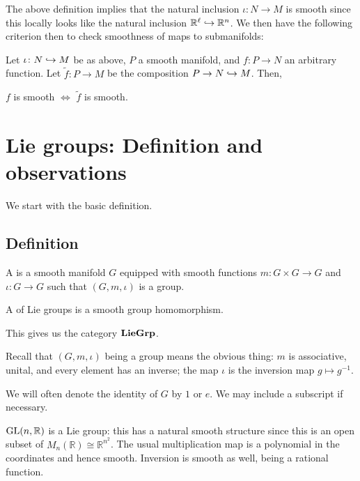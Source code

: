 \documentclass[12pt]{article}
\begin{document}
The above definition implies that the natural inclusion $\iota \colon N \to M$ is smooth since this locally looks like the natural inclusion $\mathbb{R}^{\ell} \hookrightarrow \mathbb{R}^{n}$.
We then have the following criterion then to check smoothness of maps to submanifolds:
\begin{thm} \label{thm:smoothness-into-submanifold}
	Let $\iota \colon N \hookrightarrow M$ be as above, $P$ a smooth manifold, and $f \colon P \to N$ an arbitrary function. \newline
	Let $\widetilde{f} \colon P \to M$ be the composition $P \to N \hookrightarrow M$. Then,
	\begin{center}
		$f$ is smooth $\Leftrightarrow$ $\widetilde{f}$ is smooth.
	\end{center}
\end{thm}

\section{Lie groups: Definition and observations}

We start with the basic definition.

\subsection{Definition}

\begin{defn}
	A  is a smooth manifold $G$ equipped with smooth functions $m \colon G \times G \to G$ and $\iota \colon G \to G$ such that $(G, m, \iota)$ is a group.

	A  of Lie groups is a smooth group homomorphism. 

	This gives us the category $\mathbf{LieGrp}$.
\end{defn}
Recall that $(G, m, \iota)$ being a group means the obvious thing: $m$ is associative, unital, and every element has an inverse; 
the map $\iota$ is the inversion map $g \mapsto g^{-1}$.

We will often denote the identity of $G$ by $1$ or $e$. We may include a subscript if necessary.

\begin{ex}
	$\operatorname{GL}(n, \mathbb{R})$ is a Lie group: this has a natural smooth structure since this is an open subset of $M_{n}(\mathbb{R}) \cong \mathbb{R}^{n^{2}}$. 
	The usual multiplication map is a polynomial in the coordinates and hence smooth. 
	Inversion is smooth as well, being a rational function.
\end{ex}
\end{document}
